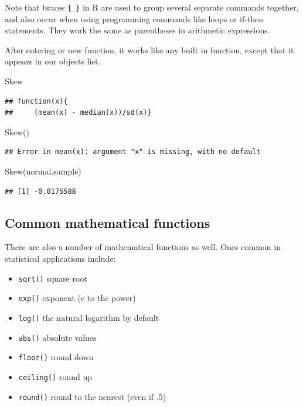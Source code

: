 \documentclass[
]{book}
\newenvironment{Shaded}{\begin{snugshade}}{\end{snugshade}}
\newcommand{\FunctionTok}[1]{\textcolor[rgb]{0.00,0.00,0.00}{#1}}
\newcommand{\NormalTok}[1]{#1}
\providecommand{\tightlist}{%
  \setlength{\itemsep}{0pt}\setlength{\parskip}{0pt}}
\begin{document}
Note that braces \texttt{\{\ \}} in R are used to group several separate commands together, and also occur when using programming commands like loops or if-then statements. They work the same as parentheses in arithmetic expressions.

After entering or new function, it works like any built in function, except that it appears in our objects list.

\begin{Shaded}
\begin{Highlighting}[]
\NormalTok{Skew}
\end{Highlighting}
\end{Shaded}

\begin{verbatim}
## function(x){
##     (mean(x) - median(x))/sd(x)}
\end{verbatim}

\begin{Shaded}
\begin{Highlighting}[]
\FunctionTok{Skew}\NormalTok{()}
\end{Highlighting}
\end{Shaded}

\begin{verbatim}
## Error in mean(x): argument "x" is missing, with no default
\end{verbatim}

\begin{Shaded}
\begin{Highlighting}[]
\FunctionTok{Skew}\NormalTok{(normal.sample)}
\end{Highlighting}
\end{Shaded}

\begin{verbatim}
## [1] -0.0175588
\end{verbatim}

\hypertarget{common-mathematical-functions}{%
\subsection*{Common mathematical functions}\label{common-mathematical-functions}}

There are also a number of mathematical functions as well. Ones common in statistical applications include:

\begin{itemize}
\tightlist
\item
  \texttt{sqrt()} square root
\item
  \texttt{exp()} exponent (e to the power)
\item
  \texttt{log()} the natural logarithm by default
\item
  \texttt{abs()} absolute values
\item
  \texttt{floor()} round down
\item
  \texttt{ceiling()} round up
\item
  \texttt{round()} round to the nearest (even if .5)
\end{itemize}
\end{document}
